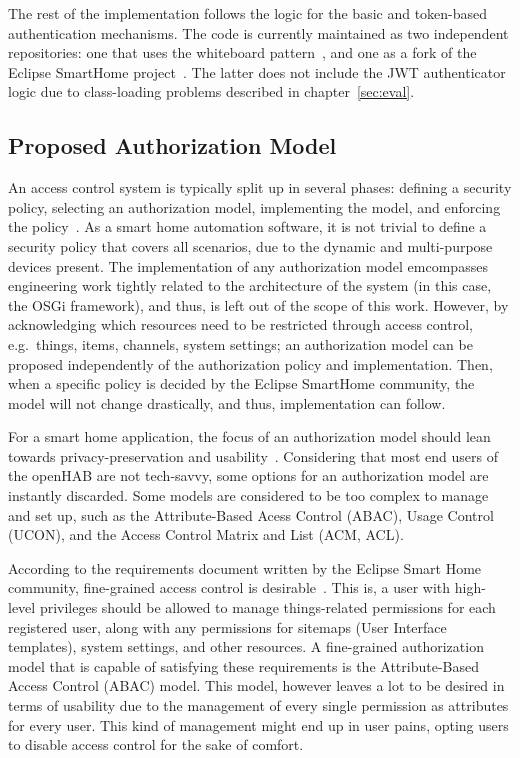 \documentclass[12pt]{article}
\begin{document}
The rest of the implementation follows the logic for the basic and token-based authentication mechanisms. The code is currently maintained as two independent repositories: one that uses the whiteboard pattern~\cite{repo_02}, and one as a fork of the Eclipse SmartHome project~\cite{repo_01}. The latter does not include the JWT authenticator logic due to class-loading problems described in chapter~\ref{sec:eval}.
  
\subsection{Proposed Authorization Model}
\label{ssec:autho}

An access control system is typically split up in several phases: defining a security policy, selecting an authorization model, implementing the model, and enforcing the policy~\cite{access_01}. As a smart home automation software, it is not trivial to define a security policy that covers all scenarios, due to the dynamic and multi-purpose devices present. The implementation of any authorization model emcompasses engineering work tightly related to the architecture of the system (in this case, the OSGi framework), and thus, is left out of the scope of this work. However, by acknowledging which resources need to be restricted through access control, e.g.\ things, items, channels, system settings; an authorization model can be proposed independently of the authorization policy and implementation. Then, when a specific policy is decided by the Eclipse SmartHome community, the model will not change drastically, and thus, implementation can follow. 

For a smart home application, the focus of an authorization model should lean towards privacy-preservation and usability~\cite{access_01}. Considering that most end users of the openHAB are not tech-savvy, some options for an authorization model are instantly discarded. Some models are considered to be too complex to manage and set up, such as the Attribute-Based Acess Control (ABAC), Usage Control (UCON), and the Access Control Matrix and List (ACM, ACL).

According to the requirements document written by the Eclipse Smart Home community, fine-grained access control is desirable~\cite{esh_06}. This is, a user with high-level privileges should be allowed to manage things-related permissions for each registered user, along with any permissions for sitemaps (User Interface templates), system settings, and other resources. A fine-grained authorization model that is capable of satisfying these requirements is the Attribute-Based Access Control (ABAC) model. This model, however leaves a lot to be desired in terms of usability due to the management of every single permission as attributes for every user. This kind of management might end up in user pains, opting users to disable access control for the sake of comfort. 
\end{document}
